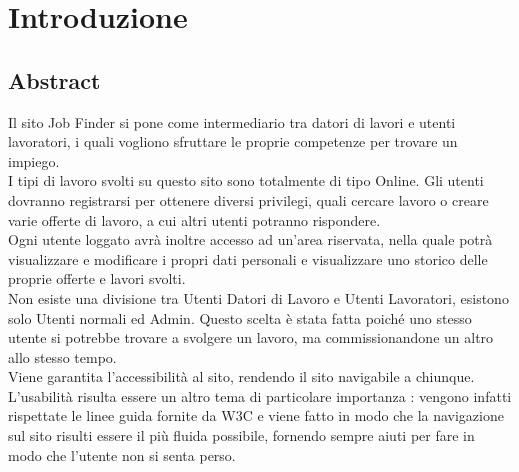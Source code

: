 \section{Introduzione}
	\subsection{Abstract}
	Il sito Job Finder si pone come intermediario tra datori di lavori e utenti lavoratori, i quali vogliono sfruttare le proprie competenze per trovare un impiego. 
	\\I tipi di lavoro svolti su questo sito sono totalmente di tipo Online. 
	Gli utenti dovranno registrarsi per ottenere diversi privilegi, quali cercare lavoro o creare varie offerte di lavoro, a cui altri utenti potranno rispondere. 
	\\Ogni utente loggato avrà inoltre accesso ad un’area riservata, nella quale potrà visualizzare e modificare i propri dati personali e visualizzare uno storico delle proprie offerte e lavori svolti.
	\\Non esiste una divisione tra Utenti Datori di Lavoro e Utenti Lavoratori, esistono solo Utenti normali ed Admin. Questo scelta è stata fatta poiché uno stesso utente si potrebbe trovare a svolgere un lavoro, ma commissionandone un altro allo stesso tempo.
	\\Viene garantita l’accessibilità al sito, rendendo il sito navigabile a chiunque.
	\\L’usabilità risulta essere un altro tema di particolare importanza : vengono infatti rispettate le linee guida fornite da W3C e viene fatto in modo che la navigazione sul sito risulti essere il più fluida possibile, fornendo sempre aiuti per fare in modo che l’utente non si senta perso.
	